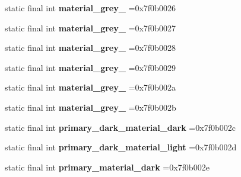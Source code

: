 \begin{DoxyCompactItemize}
static final int {\bfseries material\+\_\+grey\+\_} =0x7f0b0026
\item 
\mbox{\label{classproject4_1_1xaria_1_1R_1_1color_acf18bb9177a1899a7236e619eb2be22f}} 
static final int {\bfseries material\+\_\+grey\+\_} =0x7f0b0027
\item 
\mbox{\label{classproject4_1_1xaria_1_1R_1_1color_aed13e725e7aa6f50f7542c2867d3bda9}} 
static final int {\bfseries material\+\_\+grey\+\_} =0x7f0b0028
\item 
\mbox{\label{classproject4_1_1xaria_1_1R_1_1color_a678f235127650982a2e7648439c1d67b}} 
static final int {\bfseries material\+\_\+grey\+\_} =0x7f0b0029
\item 
\mbox{\label{classproject4_1_1xaria_1_1R_1_1color_ad154485cdae66bda4a77ea800fb0e035}} 
static final int {\bfseries material\+\_\+grey\+\_} =0x7f0b002a
\item 
\mbox{\label{classproject4_1_1xaria_1_1R_1_1color_af43919165d33f065bce4de1abedc304f}} 
static final int {\bfseries material\+\_\+grey\+\_} =0x7f0b002b
\item 
\mbox{\label{classproject4_1_1xaria_1_1R_1_1color_a83f42f79a4a0af472530dd8df171f48a}} 
static final int {\bfseries primary\+\_\+dark\+\_\+material\+\_\+dark} =0x7f0b002c
\item 
\mbox{\label{classproject4_1_1xaria_1_1R_1_1color_ae3f9160b859c8284c9a39813e798287d}} 
static final int {\bfseries primary\+\_\+dark\+\_\+material\+\_\+light} =0x7f0b002d
\item 
\mbox{\label{classproject4_1_1xaria_1_1R_1_1color_ae653f76a014070f6c977a38fd4f97ffe}} 
static final int {\bfseries primary\+\_\+material\+\_\+dark} =0x7f0b002e
\item 
\mbox{\label{classproject4_1_1xaria_1_1R_1_1color_aca4b151a3023d8034b52155efe210082}} 

\end{DoxyCompactItemize}
